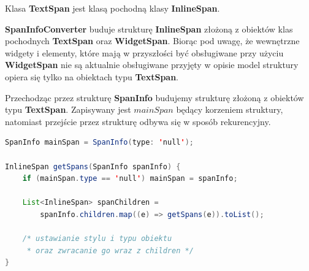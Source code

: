 Klasa \textbf{TextSpan} jest klasą pochodną klasy \textbf{InlineSpan}.

\textbf{SpanInfoConverter} buduje strukturę \textbf{InlineSpan} złożoną z obiektów klas pochodnych \textbf{TextSpan} oraz \textbf{WidgetSpan}. Biorąc pod uwagę, że wewnętrzne widgety i elementy, które mają w przyszłości być obsługiwane przy użyciu \textbf{WidgetSpan} nie są aktualnie obsługiwane przyjęty w opisie model struktury opiera się tylko na obiektach typu \textbf{TextSpan}.

Przechodząc przez strukturę \textbf{SpanInfo} budujemy strukturę złożoną z obiektów typu \textbf{TextSpan}. Zapisywany jest $mainSpan$ będący korzeniem struktury, natomiast przejście przez strukturę odbywa się w sposób rekurencyjny.

\begin{lstlisting}[language=Java]
SpanInfo mainSpan = SpanInfo(type: 'null');

InlineSpan getSpans(SpanInfo spanInfo) {
    if (mainSpan.type == 'null') mainSpan = spanInfo;

    List<InlineSpan> spanChildren =
        spanInfo.children.map((e) => getSpans(e)).toList();

    /* ustawianie stylu i typu obiektu 
     * oraz zwracanie go wraz z children */
}
\end{lstlisting}

